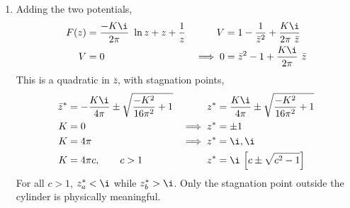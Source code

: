 \begin{enumerate}
\begin{enumerate}
              \item Adding the two potentials,
                    \begin{align}
                        F(z)       & = \frac{-K\i}{2\pi}\ \ln z + z + \frac{1}{z} &
                        V          & = 1 - \frac{1}{\bar{z}^2} + \frac{K\i}{2\pi
                        \ \bar{z}}                                                  \\
                        V          & = 0                                          &
                        \implies 0 & = \bar{z}^2 - 1 + \frac{K\i}{2\pi}\ \bar{z}
                    \end{align}
                    This is a quadratic in $ \bar{z} $, with stagnation points,
                    \begin{align}
                        \bar{z}^*                           & = -\frac{K\i}{4\pi}
                        \pm \sqrt{\frac{-K^2}{16\pi^2} + 1} &
                        z^*                                 & = \frac{K\i}{4\pi}
                        \pm \sqrt{\frac{-K^2}{16\pi^2} + 1}                         \\
                        K                                   & = 0                 &
                        \implies z^*                        & = \pm 1               \\
                        K                                   & = 4\pi              &
                        \implies z^*                        & = \i, \i              \\
                        K                                   & = 4\pi c,
                        \qquad c>1                          &
                        z^*                                 & = \i\ \Big[c \pm
                            \sqrt{c^2 - 1}\Big]
                    \end{align}
                    For all $ c > 1 $, $ z_a^* < \i $ while $ z_b^* > \i $.
                    Only the stagnation point outside the cylinder is  physically
                    meaningful.
          \end{enumerate}

\end{enumerate}